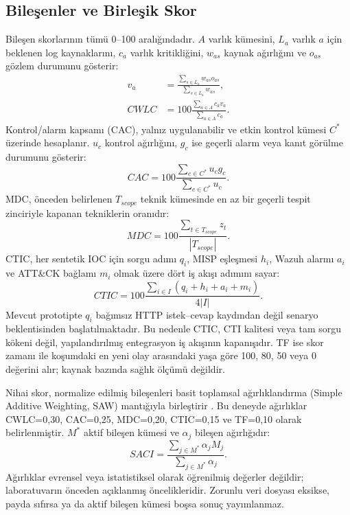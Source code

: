 \documentclass[conference]{IEEEtran}
\begin{document}
\subsection{Bileşenler ve Birleşik Skor}
Bileşen skorlarının tümü 0--100 aralığındadır. $A$ varlık kümesini, $L_a$ varlık $a$ için beklenen log kaynaklarını, $c_a$ varlık kritikliğini, $w_{as}$ kaynak ağırlığını ve $o_{as}$ gözlem durumunu gösterir:
\begin{align}
v_a &= \frac{\sum_{s\in L_a} w_{as}o_{as}}{\sum_{s\in L_a} w_{as}}, \\[-2pt]
CWLC &= 100\frac{\sum_{a\in A}c_av_a}{\sum_{a\in A}c_a}. \label{eq:cwlc}
\end{align}
Kontrol/alarm kapsamı (CAC), yalnız uygulanabilir ve etkin kontrol kümesi $C^*$ üzerinde hesaplanır. $u_c$ kontrol ağırlığını, $g_c$ ise geçerli alarm veya kanıt görülme durumunu gösterir:
\begin{equation}
CAC=100\frac{\sum_{c\in C^*}u_cg_c}{\sum_{c\in C^*}u_c}. \label{eq:cac}
\end{equation}
MDC, önceden belirlenen $T_{scope}$ teknik kümesinde en az bir geçerli tespit zinciriyle kapanan tekniklerin oranıdır:
\begin{equation}
MDC=100\frac{\sum_{t\in T_{scope}}z_t}{|T_{scope}|}. \label{eq:mdc}
\end{equation}
CTIC, her sentetik IOC için sorgu adımı $q_i$, MISP eşleşmesi $h_i$, Wazuh alarmı $a_i$ ve ATT\&CK bağlamı $m_i$ olmak üzere dört iş akışı adımını sayar:
\begin{equation}
CTIC=100\frac{\sum_{i\in I}(q_i+h_i+a_i+m_i)}{4|I|}. \label{eq:ctic}
\end{equation}
Mevcut prototipte $q_i$ bağımsız HTTP istek--cevap kaydından değil senaryo beklentisinden başlatılmaktadır. Bu nedenle CTIC, CTI kalitesi veya tam sorgu kökeni değil, yapılandırılmış entegrasyon iş akışının kapanışıdır. TF ise skor zamanı ile koşumdaki en yeni olay arasındaki yaşa göre 100, 80, 50 veya 0 değerini alır; kaynak bazında sağlık ölçümü değildir.

Nihai skor, normalize edilmiş bileşenleri basit toplamsal ağırlıklandırma (Simple Additive Weighting, SAW) mantığıyla birleştirir \cite{triantaphyllou2000}. Bu deneyde ağırlıklar CWLC=0,30, CAC=0,25, MDC=0,20, CTIC=0,15 ve TF=0,10 olarak belirlenmiştir. $M^*$ aktif bileşen kümesi ve $\alpha_j$ bileşen ağırlığıdır:
\begin{equation}
SACI=\frac{\sum_{j\in M^*}\alpha_jM_j}{\sum_{j\in M^*}\alpha_j}. \label{eq:saci}
\end{equation}
Ağırlıklar evrensel veya istatistiksel olarak öğrenilmiş değerler değildir; laboratuvarın önceden açıklanmış öncelikleridir. Zorunlu veri dosyası eksikse, payda sıfırsa ya da aktif bileşen kümesi boşsa sonuç yayımlanmaz.
\end{document}
